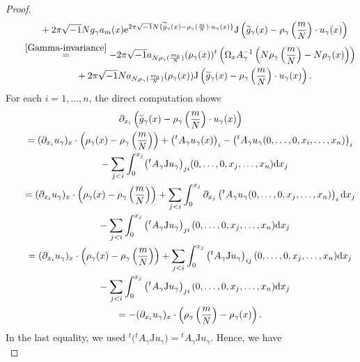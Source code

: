 \documentclass[pdftex]{sigma}
\numberwithin{equation}{section}
\renewcommand{\tilde}{\widetilde}
\def\J{\mathrm{J}}
\begin{document}
\begin{proof}
\begin{gather}
\phantom{\qquad=}{}+2\pi\sqrt{-1}Ng_\gamma a_m(x){\rm e}^{2\pi\sqrt{-1}N\{ {\tilde g}_\gamma(x)-\rho_\gamma(\frac{m}{N})\cdot u_\gamma (x)\}} \J \left( {\tilde g}_\gamma(x)-\rho_\gamma\left(\frac{m}{N}\right)\cdot u_\gamma (x)\right) \nonumber \\
\qquad\stackrel{\eqref{Gamma-invariance}}{=}-2\pi\sqrt{-1}a_{N\rho_\gamma (\frac{m_0}{N})}(\rho_\gamma(x)){}^t\left(\Omega_xA_\gamma^{-1}\left(N\rho_\gamma \left(\frac{m}{N}\right)-N\rho_\gamma (x)\right)\right)\nonumber \\
\phantom{\qquad=}{}+2\pi\sqrt{-1}Na_{N\rho_\gamma (\frac{m_0}{N})}(\rho_\gamma(x))\J \left( {\tilde g}_\gamma(x)-\rho_\gamma\left(\frac{m}{N}\right)\cdot u_\gamma (x)\right) .\label{RHS}
\end{gather}
For each $i=1,\ldots ,n$, the direct computation shows
\begin{gather*}
\partial_{x_i}\left( {\tilde g}_\gamma(x)-\rho_\gamma\left(\frac{m}{N}\right)\cdot u_\gamma (x)\right)\\
\qquad=(\partial_{x_i}u_\gamma)_x\cdot \left(\rho_\gamma (x)-\rho_\gamma \left(\frac{m}{N}\right)\right)+\left({}^tA_\gamma u_\gamma(x)\right)_i-\left({}^tA_\gamma u_\gamma(0,\ldots ,0,x_i,\ldots ,x_n)\right)_i\\
\phantom{\qquad=}{} -\sum_{j<i}\int_0^{x_j}\bigl({}^tA_\gamma \J u_\gamma\bigr)_{ji}(0,\ldots ,0,x_j,\ldots ,x_n){\rm d}x_j \\
\qquad=(\partial_{x_i}u_\gamma)_x\cdot \left(\rho_\gamma (x)-\rho_\gamma \left(\frac{m}{N}\right)\right)
+\sum_{j<i}\int_0^{x_j}\partial_{x_j}\left({}^tA_\gamma u_\gamma (0,\ldots ,0,x_j,\ldots ,x_n)\right)_i{\rm d}x_j \\
\phantom{\qquad=}{} -\sum_{j<i}\int_0^{x_j}\left({}^tA_\gamma \J u_\gamma\right)_{ji}(0,\ldots ,0,x_j,\ldots ,x_n){\rm d}x_j \\
\qquad=(\partial_{x_i}u_\gamma)_x\cdot \left(\rho_\gamma (x)-\rho_\gamma \left(\frac{m}{N}\right)\right)
+\sum_{j<i}\int_0^{x_j}\left({}^tA_\gamma \J u_\gamma \right)_{ij}(0,\ldots ,0,x_j,\ldots ,x_n){\rm d}x_j\\
\phantom{\qquad=}{} -\sum_{j<i}\int_0^{x_j}\left({}^tA_\gamma \J u_\gamma\right)_{ji}(0,\ldots ,0,x_j,\ldots ,x_n){\rm d}x_j \\
\qquad=-(\partial_{x_i}u_\gamma)_x\cdot \left(\rho_\gamma \left(\frac{m}{N}\right)-\rho_\gamma (x)\right) .
\end{gather*}
In the last equality, we used ${}^t\bigl({}^tA_\gamma \J u_\gamma\bigr)={}^tA_\gamma \J u_\gamma$. Hence, we have
\begin{equation}\label{RHS2}

\end{equation}
\end{proof}
\end{document}
